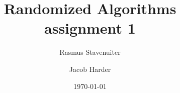 


\author{Rasmus Stavenuiter \and Jacob Harder}
\date{\today}
\title{Randomized Algorithms assignment 1}


\maketitle




